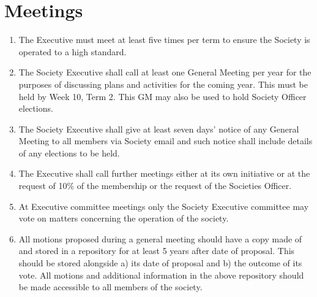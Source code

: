 \documentclass[a4paper,11pt,parskip=half-]{scrartcl} %
\begin{document}
\section{Meetings}
\begin{enumerate}
    \item The Executive must meet at least five times per term to ensure the Society is operated to a high standard.
    \item The Society Executive shall call at least one General Meeting per year for the purposes of discussing plans and activities for the coming year. This must be held by Week 10, Term 2. This GM may also be used to hold Society Officer elections.
    \item The Society Executive shall give at least seven days' notice of any General Meeting to all members via Society email and such notice shall include details of any elections to be held.
    \item The Executive shall call further meetings either at its own initiative or at the request of 10\% of the membership or the request of the Societies Officer.
    \item At Executive committee meetings only the Society Executive committee may vote on matters concerning the operation of the society.
    \item All motions proposed during a general meeting should have a copy made of and stored in a repository for at least 5 years after date of proposal. This should be stored alongside a) its date of proposal and b) the outcome of its vote. All motions and additional information in the above repository should be made accessible to all members of the society.
\end{enumerate}
\end{document}
